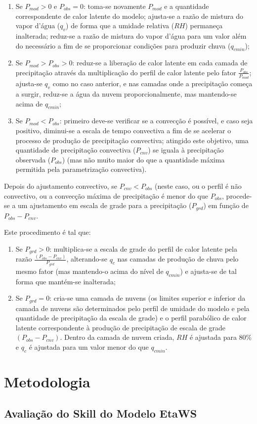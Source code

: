 \begin{enumerate}
\item Se $P_{mod}>0$ e $P_{obs}=0$: toma-se novamente $P_{mod}$ e a quantidade correspondente de calor latente do modelo; ajusta-se a razão de mistura do vapor d'água ($q_{v}$) de forma que a umidade relativa ($RH$) permaneça inalterada; reduz-se a razão de mistura do vapor d'água para um valor além do necessário a fim de se proporcionar condições para produzir chuva ($q_{cmin}$);
\item Se $P_{mod}>P_{obs}>0$: reduz-se a liberação de calor latente em cada camada de precipitação através da multiplicação do perfil de calor latente pelo fator $\frac{P_{obs}}{P_{mod}}$; ajusta-se $q_{v}$ como no caso anterior, e nas camadas onde a precipitação começa a surgir, reduz-se a água da nuvem proporcionalmente, mas mantendo-se acima de $q_{cmin}$;
\item Se $P_{mod}<P_{obs}$: primeiro deve-se verificar se a convecção é possível, e caso seja positivo, diminui-se a escala de tempo convectiva a fim de se acelerar o processo de produção de precipitação convectiva; atingido este objetivo, uma quantidade de precipitação convectiva ($P_{cnv}$) se iguala à precipitação observada ($P_{obs}$) (mas não muito maior do que a quantidade máxima permitida pela parametrização convectiva).
\end{enumerate}

Depois do ajustamento convectivo, se $P_{cnv}<P_{obs}$ (neste caso, ou o perfil é não convectivo, ou a convecção máxima de precipitação é menor do que $P_{obs}$, procede-se a um ajustamento em escala de grade para a precipitação ($P_{grd}$) em função de $P_{obs}-P_{cnv}$.

Este procedimento é tal que:

\begin{enumerate}
\item Se $P_{grd}>0$: multiplica-se a escala de grade do perfil de calor latente pela razão $\frac{(P_{obs}-P_{cnv})}{P_{grd}}$, alterando-se $q_{c}$ nas camadas de produção de chuva pelo mesmo fator (mas mantendo-o acima do nível de $q_{cmin}$) e ajusta-se de tal forma que mantém-se inalterada;
\item Se $P_{grd}=0$: cria-se uma camada de nuvens (os limites superior e inferior da camada de nuvens são determinados pelo perfil de umidade do modelo e pela quantidade de precipitação da escala de grade) e o perfil parabólico de calor latente correspondente à produção de precipitação de escala de grade $(P_{obs}-P_{cnv})$. Dentro da camada de nuvem criada, $RH$ é ajustada para 80\% e $q_{c}$ é ajustada para um valor menor do que $q_{cmin}$.
\end{enumerate}

\section{Metodologia}
\label{ss:metodologia}

\subsection{Avaliação do Skill do Modelo EtaWS}


